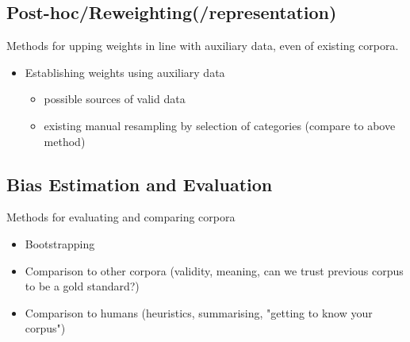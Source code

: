 \subsection{Post-hoc/Reweighting(/representation)}
Methods for upping weights in line with auxiliary data, even of existing corpora.

\begin{itemize}
    \item Establishing weights using auxiliary data
    \begin{itemize}
        \item possible sources of valid data
        \item existing manual resampling by selection of categories (compare to above method)
    \end{itemize}
\end{itemize}












\subsection{Bias Estimation and Evaluation}
Methods for evaluating and comparing corpora


\begin{itemize}
    \item Bootstrapping
    \item Comparison to other corpora (validity, meaning, can we trust previous corpus to be a gold standard?)
    \item Comparison to humans (heuristics, summarising, "getting to know your corpus")
\end{itemize}



